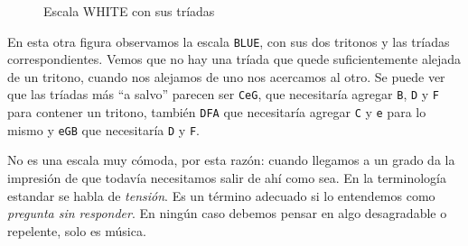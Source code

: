 \documentclass[]{report}
\begin{document}
\begin{figure}[H]
\begin{subfigure}{1\textwidth}
{
		}

	\end{subfigure}
	\caption{Escala \textsf{WHITE} con sus tríadas}\label{fig:white-scale-with-its-triads}
\end{figure}


{\sloppy En esta otra figura observamos la escala \texttt{BLUE}, con sus dos tritonos y las tríadas correspondientes. Vemos que no hay una tríada que quede suficientemente alejada de un tritono, cuando nos alejamos de uno nos acercamos al otro. Se puede ver que las tríadas más ``a salvo'' parecen ser \texttt{CeG}, que necesitaría agregar \texttt{B}, \texttt{D} y \texttt{F} para contener un tritono, también \texttt{DFA} que necesitaría agregar \texttt{C} y \texttt{e} para lo mismo y \texttt{eGB} que necesitaría \texttt{D} y \texttt{F}.
}

No es una escala muy cómoda, por esta razón: cuando llegamos a un grado da la impresión de que todavía necesitamos salir de ahí como sea. En la terminología estandar se habla de \emph{tensión}. Es un término adecuado si lo entendemos como \emph{pregunta sin responder}. En ningún caso debemos pensar en algo desagradable o repelente, solo es música.
\end{document}
